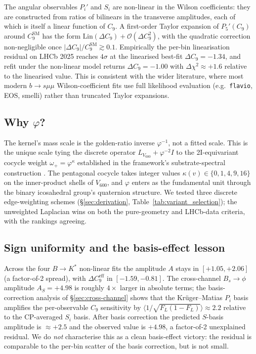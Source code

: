 The angular observables $P_{i}'$ and $S_{i}$ are non-linear in the
Wilson coefficients: they are constructed from ratios of bilinears in
the transverse amplitudes, each of which is itself a linear function
of $C_{9}$. A first-order Taylor expansion of $P_{5}'(C_{9})$ around
$C_{9}^{\mathrm{SM}}$ has the form $\mathrm{Lin}(\Delta C_{9}) +
\mathcal{O}(\Delta C_{9}^{2})$, with the quadratic correction
non-negligible once $|\Delta C_{9}|/C_{9}^{\mathrm{SM}}\gtrsim 0.1$.
Empirically the per-bin linearisation residual on LHCb 2025 reaches
$4\sigma$ at the linearised best-fit $\Delta C_{9}=-1.34$, and refit
under the non-linear model returns $\Delta C_{9}=-1.00$ with
$\Delta\chi^{2}\approx +1.6$ relative to the linearised value.
This is consistent with the wider literature, where most modern
$b\to s\mu\mu$ Wilson-coefficient fits use full likelihood evaluation
(e.g.\ \texttt{flavio}, EOS, smelli) rather than truncated Taylor
expansions.

\subsection{Why $\varphi$?}

The kernel's mass scale is the golden-ratio inverse $\varphi^{-1}$,
not a fitted scale. This is the unique scale tying the discrete
operator $L_{V_{600}} + \varphi^{-2}I$ to the 2I-equivariant cocycle
weight $\omega_{+}=\varphi^{\kappa}$ established in the framework's
substrate-spectral construction
\citep{SmartCrystallisation2026, SmartAdaptiveClosureTransport2026}.
The pentagonal cocycle takes integer values
$\kappa(v)\in\{0,1,4,9,16\}$ on the inner-product shells of $V_{600}$,
and $\varphi$ enters as the fundamental unit through the binary
icosahedral group's quaternion structure. We tested three discrete
edge-weighting schemes (\S\ref{sec:derivation},
Table~\ref{tab:variant_selection}); the unweighted Laplacian wins on
both the pure-geometry and LHCb-data criteria, with the rankings
agreeing.

\subsection{Sign uniformity and the basis-effect lesson}

Across the four $B\to K^{*}$ non-linear fits the amplitude $A$ stays
in $[+1.05,+2.06]$ (a factor-of-2 spread), with $\Delta C_{9}^{\mathrm{eff}}$
in $[-1.59,-0.81]$. The cross-channel $B_{s}\!\to\!\phi$ amplitude
$A_{S}=+4.98$ is roughly $4\times$ larger in absolute terms; the
basis-correction analysis of \S\ref{sec:cross-channel} shows that the
Krüger--Matias $P_{i}$ basis amplifies the per-observable $C_{9}$
sensitivity by $\langle 1/\sqrt{F_{L}(1-F_{L})}\rangle\approx 2.2$
relative to the CP-averaged $S_{i}$ basis. After basis correction the
predicted $S$-basis amplitude is $\approx +2.5$ and the observed value
is $+4.98$, a factor-of-2 unexplained residual. We do \emph{not}
characterise this as a clean basis-effect victory: the residual is
comparable to the per-bin scatter of the basis correction, but is not
small.

